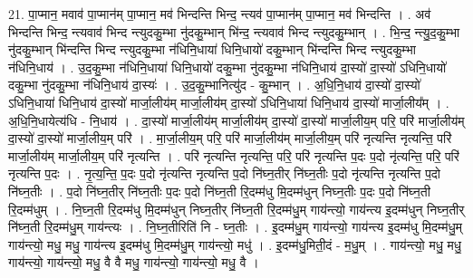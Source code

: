 \documentclass[17pt]{extarticle}
\begin{document}
21. पा॒प्मान॒ मवाव॑ पा॒प्मान॑म् पा॒प्मान॒ मव॑ भिन्दन्ति भिन्द॒ न्त्यव॑ पा॒प्मान॑म् पा॒प्मान॒ मव॑ भिन्दन्ति । . अव॑ भिन्दन्ति भिन्द॒ न्त्यवाव॑ भिन्द न्त्युदकु॒म्भा नु॑दकु॒म्भान् भि॑न्द॒ न्त्यवाव॑ भिन्द न्त्युदकु॒म्भान् । . भि॒न्द॒ न्त्यु॒द॒कु॒म्भा नु॑दकु॒म्भान् भि॑न्दन्ति भिन्द न्त्युदकु॒म्भा न॑धिनि॒धाया॑ धिनि॒धायो॑ दकु॒म्भान् भि॑न्दन्ति भिन्द न्त्युदकु॒म्भा न॑धिनि॒धाय॑ । . उ॒द॒कु॒म्भा न॑धिनि॒धाया॑ धिनि॒धायो॑ दकु॒म्भा नु॑दकु॒म्भा न॑धिनि॒धाय॑ दा॒स्यो॑ दा॒स्यो॑ ऽधिनि॒धायो॑ दकु॒म्भा नु॑दकु॒म्भा न॑धिनि॒धाय॑ दा॒स्यः॑ । . उ॒द॒कु॒म्भानित्यु॑द - कु॒म्भान् । . अ॒धि॒नि॒धाय॑ दा॒स्यो॑ दा॒स्यो॑ ऽधिनि॒धाया॑ धिनि॒धाय॑ दा॒स्यो॑ मार्जा॒लीय॑म् मार्जा॒लीय॑म् दा॒स्यो॑ ऽधिनि॒धाया॑ धिनि॒धाय॑ दा॒स्यो॑ मार्जा॒लीय᳚म् । . अ॒धि॒नि॒धायेत्य॑धि - नि॒धाय॑ । . दा॒स्यो॑ मार्जा॒लीय॑म् मार्जा॒लीय॑म् दा॒स्यो॑ दा॒स्यो॑ मार्जा॒लीय॒म् परि॒ परि॑ मार्जा॒लीय॑म् दा॒स्यो॑ दा॒स्यो॑ मार्जा॒लीय॒म् परि॑ । . मा॒र्जा॒लीय॒म् परि॒ परि॑ मार्जा॒लीय॑म् मार्जा॒लीय॒म् परि॑ नृत्यन्ति नृत्यन्ति॒ परि॑ मार्जा॒लीय॑म् मार्जा॒लीय॒म् परि॑ नृत्यन्ति । . परि॑ नृत्यन्ति नृत्यन्ति॒ परि॒ परि॑ नृत्यन्ति प॒दः प॒दो नृ॑त्यन्ति॒ परि॒ परि॑ नृत्यन्ति प॒दः । . नृ॒त्य॒न्ति॒ प॒दः प॒दो नृ॑त्यन्ति नृत्यन्ति प॒दो नि॑घ्न॒तीर् नि॑घ्न॒तीः प॒दो नृ॑त्यन्ति नृत्यन्ति प॒दो नि॑घ्न॒तीः । . प॒दो नि॑घ्न॒तीर् नि॑घ्न॒तीः प॒दः प॒दो नि॑घ्न॒ती रि॒दम्म॑धु मि॒दम्म॑धुन् निघ्न॒तीः प॒दः प॒दो नि॑घ्न॒ती रि॒दम्म॑धुम् । . नि॒घ्न॒ती रि॒दम्म॑धु मि॒दम्म॑धुन् निघ्न॒तीर् नि॑घ्न॒ती रि॒दम्म॑धु॒म् गाय॑न्त्यो॒ गाय॑न्त्य इ॒दम्म॑धुन् निघ्न॒तीर् नि॑घ्न॒ती रि॒दम्म॑धु॒म् गाय॑न्त्यः । . नि॒घ्न॒तीरिति॑ नि - घ्न॒तीः । . इ॒दम्म॑धु॒म् गाय॑न्त्यो॒ गाय॑न्त्य इ॒दम्म॑धु मि॒दम्म॑धु॒म् गाय॑न्त्यो॒ मधु॒ मधु॒ गाय॑न्त्य इ॒दम्म॑धु मि॒दम्म॑धु॒म् गाय॑न्त्यो॒ मधु॑ । . इ॒दम्म॑धु॒मिती॒दं - म॒धु॒म् । . गाय॑न्त्यो॒ मधु॒ मधु॒ गाय॑न्त्यो॒ गाय॑न्त्यो॒ मधु॒ वै वै मधु॒ गाय॑न्त्यो॒ गाय॑न्त्यो॒ मधु॒ वै । \newline
\end{document}
